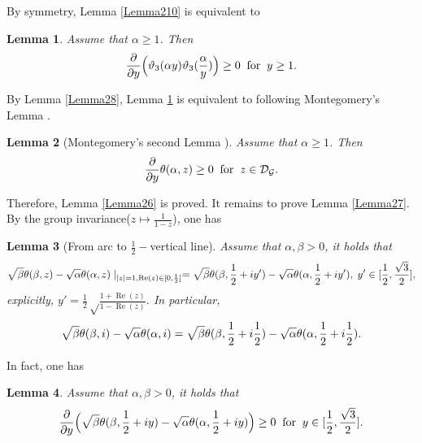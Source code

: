 \documentclass[reqno,english]{amsart}
\newtheorem{lemma}{Lemma}[section]
\newtheorem{open problem}{Open Problem}[section]
\newtheorem{open question}{Open Question}[section]
\newtheorem{open questions on hexagonal lattice}{Open Questions on hexagonal lattice}[section]
\renewcommand{\Re}{\operatorname{Re}}
\begin{document}
By symmetry, Lemma \ref{Lemma210} is equivalent to
\begin{lemma}\label{Lemma211} Assume that $\alpha\geq1$. Then
\begin{equation}\aligned\nonumber
\frac{\partial}{\partial y}
\Big(\vartheta_3(\alpha y)\vartheta_3(\frac{\alpha}{y})\Big)\geq0\;\;\hbox{for}\;\;y\geq1.
\endaligned\end{equation}


\end{lemma}
By Lemma \ref{Lemma28}, Lemma \ref{Lemma211} is equivalent to following Montegomery's Lemma \cite{Mon1988}.
\begin{lemma}[Montegomery's second Lemma \cite{Mon1988}]\label{Lemma212} Assume that $\alpha\geq1$. Then
\begin{equation}\aligned\nonumber
\frac{\partial}{\partial y}
\theta(\alpha,z)\geq0\;\;\hbox{for}\;\;z\in\mathcal{D}_{\mathcal{G}}.
\endaligned\end{equation}


\end{lemma}

Therefore, Lemma \ref{Lemma26} is proved. It remains to prove Lemma \ref{Lemma27}.
By the group invariance($z\mapsto\frac{1}{1-z}$), one has

\begin{lemma}[From arc to $\frac{1}{2}-$vertical line] \label{Lemma213} Assume that $\alpha, \beta>0$, it holds that
\begin{equation}\aligned\nonumber
\sqrt\beta\theta(\beta,z)-\sqrt\alpha\theta(\alpha,z)\mid_{|z|=1, \Re(z)\in[0,\frac{1}{2}]}
=\sqrt\beta\theta(\beta,\frac{1}{2}+iy')-\sqrt\alpha\theta(\alpha,\frac{1}{2}+iy'),\;  y'\in[\frac{1}{2},\frac{\sqrt3}{2}],
\endaligned\end{equation}
explicitly, $y'=\frac{1}{2}\sqrt\frac{1+\Re(z)}{1-\Re(z)}$. In particular,
\begin{equation}\aligned\label{P100}
\sqrt\beta\theta(\beta,i)-\sqrt\alpha\theta(\alpha,i)
=\sqrt\beta\theta(\beta,\frac{1}{2}+i\frac{1}{2})-\sqrt\alpha\theta(\alpha,\frac{1}{2}+i\frac{1}{2}).
\endaligned\end{equation}

\end{lemma}

In fact, one has

\begin{lemma}\label{Lemma214}
 Assume that $\alpha, \beta>0$, it holds that
\begin{equation}\aligned\nonumber
\frac{\partial}{\partial y}\Big(\sqrt\beta\theta(\beta,\frac{1}{2}+iy)-\sqrt\alpha\theta(\alpha,\frac{1}{2}+iy)
\Big)\geq0\;\;\hbox{for}\;\;
y\in[\frac{1}{2},\frac{\sqrt3}{2}].
\endaligned\end{equation}
\end{lemma}
\end{document}
